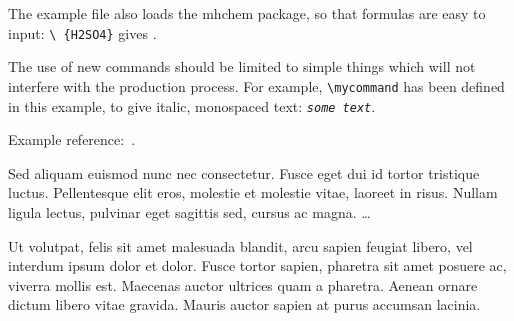 \documentclass[
journal=jacsat, %
manuscript=article]{achemso}
\newcommand*{\mycommand}[1]{\texttt{\emph{#1}}}
\begin{document}
The example file also loads the \textsf{mhchem} package, so
that formulas are easy to input: \texttt{\textbackslash
\ce\{H2SO4\}} gives .

The use of new commands should be limited to simple things which will
not interfere with the production process.  For example,
\texttt{\textbackslash mycommand} has been defined in this example,
to give italic, monospaced text: \mycommand{some text}.

Example reference:~\cite{Einstein}.


\acknowledgement

Sed aliquam euismod nunc nec consectetur. Fusce eget dui id tortor tristique luctus. Pellentesque elit eros, molestie et molestie vitae, laoreet in risus. Nullam ligula lectus, pulvinar eget sagittis sed, cursus ac magna. \ldots

\suppinfo

Ut volutpat, felis sit amet malesuada blandit, arcu sapien feugiat libero, vel interdum ipsum dolor et dolor. Fusce tortor sapien, pharetra sit amet posuere ac, viverra mollis est. Maecenas auctor ultrices quam a pharetra. Aenean ornare dictum libero vitae gravida. Mauris auctor sapien at purus accumsan lacinia.



\end{document}
